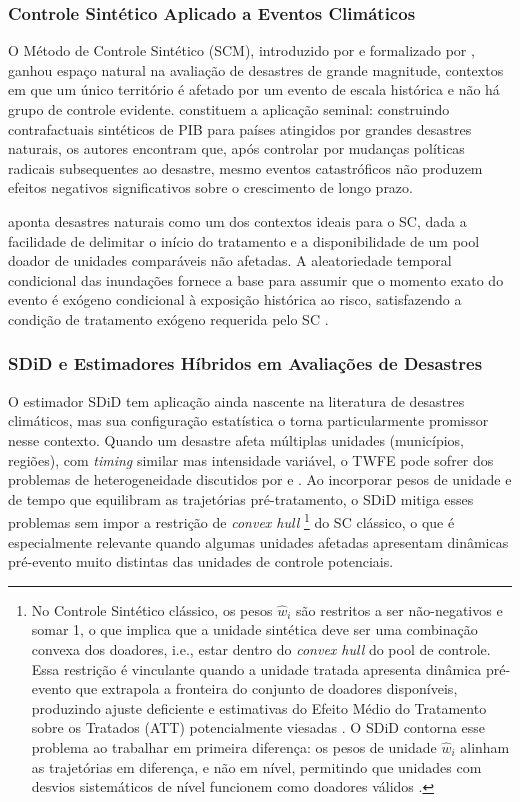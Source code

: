 \documentclass[a4paper,12pt]{article}
\begin{document}
\subsubsection{Controle Sintético Aplicado a Eventos Climáticos}

O Método de Controle Sintético (SCM), introduzido por  e
formalizado por , ganhou espaço natural na avaliação
de desastres de grande magnitude, contextos em que um único território é afetado por
um evento de escala histórica e não há grupo de controle evidente. 
constituem a aplicação seminal: construindo contrafactuais sintéticos de PIB para países
atingidos por grandes desastres naturais, os autores encontram que, após controlar por
mudanças políticas radicais subsequentes ao desastre, mesmo eventos catastróficos não
produzem efeitos negativos significativos sobre o crescimento de longo prazo.

 aponta desastres naturais como um dos contextos ideais para o
SC, dada a facilidade de delimitar o início do tratamento e a disponibilidade de um
pool doador de unidades comparáveis não afetadas. A aleatoriedade temporal condicional das inundações fornece a base para assumir que o
momento exato do evento é exógeno condicional à exposição histórica ao risco,
satisfazendo a condição de tratamento exógeno requerida pelo SC \cite{elsner2024}.

\subsubsection{SDiD e Estimadores Híbridos em Avaliações de Desastres}

O estimador SDiD \cite{arkhangelsky2021} tem aplicação ainda nascente na literatura de
desastres climáticos, mas sua configuração estatística o torna particularmente promissor
nesse contexto. Quando um desastre afeta múltiplas unidades (municípios, regiões), com
\textit{timing} similar mas intensidade variável, o TWFE pode sofrer dos problemas de
heterogeneidade discutidos por  e
. Ao incorporar pesos de unidade e de tempo que
equilibram as trajetórias pré-tratamento, o SDiD mitiga esses problemas sem impor a
restrição de \textit{convex hull}%
\footnote{No Controle Sintético clássico, os pesos $\hat{w}_i$ são restritos a ser
não-negativos e somar 1, o que implica que a unidade sintética deve ser uma
combinação convexa dos doadores, i.e., estar dentro do \textit{convex hull} do
pool de controle. Essa restrição é vinculante quando a unidade tratada apresenta
dinâmica pré-evento que extrapola a fronteira do conjunto de doadores disponíveis,
produzindo ajuste deficiente e estimativas do Efeito Médio do Tratamento sobre os
Tratados (ATT) potencialmente viesadas \cite{abadie2021}. O SDiD contorna esse problema ao trabalhar em primeira diferença:
os pesos de unidade $\hat{w}_i$ alinham as trajetórias em diferença, e não em nível,
permitindo que unidades com desvios sistemáticos de nível funcionem como doadores
válidos \cite{arkhangelsky2021}.}
do SC clássico, o que é especialmente relevante quando
algumas unidades afetadas apresentam dinâmicas pré-evento muito distintas das unidades
de controle potenciais.
\end{document}
